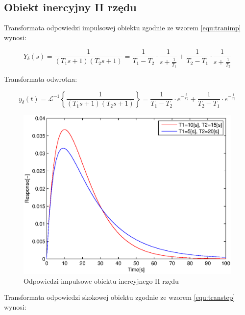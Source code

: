 \documentclass[12pt]{article}
\begin{document}
\newpage

\subsection{Obiekt inercyjny II rzędu}

Transformata odpowiedzi impulsowej obiektu zgodnie ze wzorem \eqref{equ:tranimp}
wynosi:

\begin{equation*}
	Y_{\delta}(s)=\frac{1}{(T_1s+1)(T_2s+1)} =
		\frac{1}{T_1-T_2}\cdot \frac{1}{s+\frac{1}{T_1}}+
		\frac{1}{T_2-T_1}\cdot \frac{1}{s+\frac{1}{T_2}}
\end{equation*}

Transformata odwrotna:

\begin{equation*}
	y_{\delta}(t)=\mathcal{L}^{-1}\left\{\frac{1}{(T_1s+1)(T_2s+1)}\right\} =
		\frac{1}{T_1-T_2}\cdot e^{-\frac{t}{T_1}}+
		\frac{1}{T_2-T_1}\cdot e^{-\frac{t}{T_2}}
\end{equation*}

\begin{figure}[!htb]
	\begin{center}
		\includegraphics[width=14cm]{../res/img/imp2.eps}
	\end{center}
	\caption{Odpowiedzi impulsowe obiektu inercyjnego II rzędu}
\end{figure}

\newpage

Transformata odpowiedzi skokowej obiektu zgodnie ze wzorem \eqref{equ:transtep}
wynosi:
\end{document}
